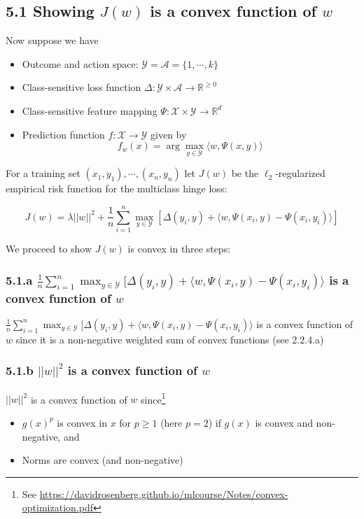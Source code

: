 \documentclass[paper=a4, fontsize=11pt]{scrartcl} %
\numberwithin{equation}{section} %
\numberwithin{figure}{section} %
\numberwithin{table}{section} %
\begin{document}
\subsection*{5.1 Showing $J(w)$ is a convex function of $w$}

Now suppose we have
\begin{itemize}
\item Outcome and action space: $\mathcal{Y} = \mathcal{A} = \{1, \cdots, k\}$
\item Class-sensitive loss function $\Delta: \mathcal{Y} \times \mathcal{A} \to \mathbb{R}^{\geq 0}$
\item Class-sensitive feature mapping $\Psi: \mathcal{X} \times \mathcal{Y} \to \mathbb{R}^d$
\item Prediction function $f: \mathcal{X} \to \mathcal{Y}$ given by
\[f_w(x) = \arg \max_{y \in \mathcal{Y}} \langle w, \Psi(x,y) \rangle\]
\end{itemize}

For a training set $(x_1, y_1), \cdots, (x_n, y_n)$ let $J(w)$ be the $\ell_2$-regularized empirical risk function for the multiclass hinge loss:

\[J(w) = \lambda ||w||^2 + \frac{1}{n} \sum_{i = 1}^n \max_{y \in \mathcal{Y}}[\Delta(y_i, y) +  \langle w, \Psi(x_i,y) - \Psi(x_i,y_i) \rangle ]\]

We proceed to show $J(w)$ is convex in three steps:

\subsubsection*{5.1.a $\frac{1}{n} \sum_{i = 1}^n \max_{y \in \mathcal{Y}}[\Delta(y_i, y) +  \langle w, \Psi(x_i,y) - \Psi(x_i,y_i) \rangle$ is a convex function of $w$}

$\frac{1}{n} \sum_{i = 1}^n \max_{y \in \mathcal{Y}}[\Delta(y_i, y) +  \langle w, \Psi(x_i,y) - \Psi(x_i,y_i) \rangle$ is a convex function of $w$ since it is a non-negative weighted sum of convex functions (see 2.2.4.a)

\subsubsection*{5.1.b $||w||^2$ is a convex function of $w$}

$||w||^2$ is a convex function of $w$ since\footnote{See \url{https://davidrosenberg.github.io/mlcourse/Notes/convex-optimization.pdf}}
\begin{itemize}
\item $g(x)^p$ is convex in $x$ for $p \geq 1$ (here $p=2$) if $g(x)$ is convex and non-negative, and
\item Norms are convex (and non-negative)
\end{itemize}
\end{document}
